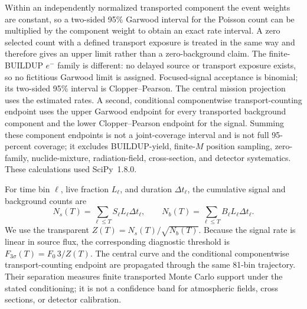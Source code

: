 \documentclass[11pt]{article}
\begin{document}
Within an independently normalized transported component the event weights are
constant, so a two-sided 95\% Garwood interval for the Poisson count can be
multiplied by the component weight to obtain an exact rate interval. A zero
selected count with a defined transport exposure is treated in the same way and
therefore gives an upper limit rather than a zero-background claim. The finite-
BUILDUP $e^-$ family is different: no delayed source or transport exposure exists,
so no fictitious Garwood limit is assigned. Focused-signal acceptance is binomial;
its two-sided 95\% interval is Clopper--Pearson. The central mission projection
uses the estimated rates. A second, conditional componentwise transport-counting
endpoint uses the upper Garwood endpoint for every transported background
component and the lower Clopper--Pearson endpoint for the signal. Summing these
component endpoints is not a joint-coverage interval and is not full 95-percent
coverage; it excludes BUILDUP-yield, finite-$M$ position sampling,
zero-family, nuclide-mixture, radiation-field, cross-section, and detector
systematics. These calculations used SciPy~1.8.0.

For time bin $\ell$, live fraction $L_\ell$, and duration $\Delta t_\ell$, the
cumulative signal and background counts are
\begin{equation}
 N_s(T)=\sum_{\ell\leq T} S_\ell L_\ell\Delta t_\ell,
 \qquad
 N_b(T)=\sum_{\ell\leq T} B_\ell L_\ell\Delta t_\ell.
 \label{eq:cumulative_counts}
\end{equation}
We use the transparent  $Z(T)=N_s(T)/\sqrt{N_b(T)}$. Because the
signal rate is linear in source flux, the corresponding diagnostic threshold is
$F_{3\sigma}(T)=F_0\,3/Z(T)$. The central curve and the conditional componentwise
transport-counting endpoint are propagated through the same 81-bin trajectory.
Their separation measures finite transported Monte Carlo support under the stated
conditioning; it is not a confidence band for atmospheric fields, cross sections,
or detector calibration.
\end{document}
